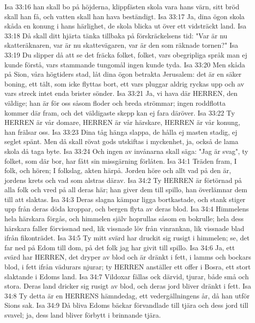 Isa 33:16  han skall bo på höjderna, klippfästen skola vara hans värn, sitt bröd skall han få, och vatten skall han hava beständigt.
Isa 33:17  Ja, dina ögon skola skåda en konung i hans härlighet, de skola blicka ut över ett vidsträckt land.
Isa 33:18  Då skall ditt hjärta tänka tillbaka på förskräckelsens tid: "Var är nu skatteräknaren, var är nu skattevägaren, var är den som räknade tornen?"
Isa 33:19  Du slipper då att se det fräcka folket, folket, vars obegripliga språk man ej kunde förstå, vars stammande tungomål ingen kunde tyda.
Isa 33:20  Men skåda på Sion, våra högtiders stad, låt dina ögon betrakta Jerusalem: det är en säker boning, ett tält, som icke flyttas bort, ett vars pluggar aldrig ryckas upp och av vars streck intet enda brister sönder.
Isa 33:21  Ja, vi hava där HERREN, den väldige; han är för oss såsom floder och breda strömmar; ingen roddflotta kommer där fram, och det väldigaste skepp kan ej fara däröver.
Isa 33:22  Ty HERREN är vår domare, HERREN är vår härskare, HERREN är vår konung, han frälsar oss.
Isa 33:23  Dina tåg hänga slappa, de hålla ej masten stadig, ej seglet spänt. Men då skall rövat gods utskiftas i myckenhet, ja, också de lama skola då taga byte.
Isa 33:24  Och ingen av invånarna skall säga: "Jag är svag", ty folket, som där bor, har fått sin missgärning förlåten.
Isa 34:1  Träden fram, I folk, och hören; I folkslag, akten härpå. Jorden höre och allt vad på den är, jordens krets och vad som alstras därav.
Isa 34:2  Ty HERREN är förtörnad på alla folk och vred på all deras här; han giver dem till spillo, han överlämnar dem till att slaktas.
Isa 34:3  Deras slagna kämpar ligga bortkastade, och stank stiger upp från deras döda kroppar, och bergen flyta av deras blod.
Isa 34:4  Himmelens hela härskara förgås, och himmelen själv hoprullas såsom en bokrulle; hela dess härskara faller förvissnad ned, lik vissnade löv från vinrankan, lik vissnade blad ifrån fikonträdet.
Isa 34:5  Ty mitt svärd har druckit sig rusigt i himmelen; se, det far ned på Edom till dom, på det folk jag har givit till spillo.
Isa 34:6  Ja, ett svärd har HERREN, det dryper av blod och är dränkt i fett, i lamms och bockars blod, i fett ifrån vädurars njurar; ty HERREN anställer ett offer i Bosra, ett stort slaktande i Edoms land.
Isa 34:7  Vildoxar fällas ock därvid, tjurar, både små och stora. Deras land dricker sig rusigt av blod, och deras jord bliver dränkt i fett.
Isa 34:8  Ty detta är en HERRENS hämndedag, ett vedergällningens år, då han utför Sions sak.
Isa 34:9  Då bliva Edoms bäckar förvandlade till tjära och dess jord till svavel; ja, dess land bliver förbytt i brinnande tjära.
